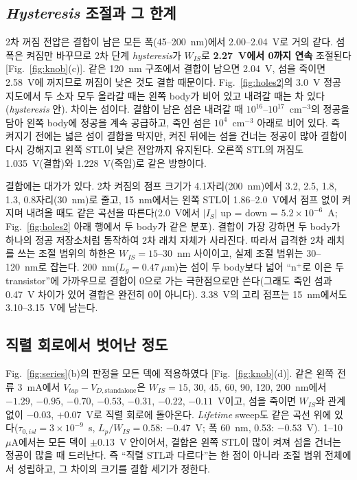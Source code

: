 \documentclass[journal]{IEEEtran}
\begin{document}
\subsection{\textit{Hysteresis} 조절과 그 한계}
2차 꺼짐 전압은 결합이 남은 모든 폭(45--200~nm)에서 2.00--2.04~V로 거의 같다. 섬 폭은 켜짐만 바꾸므로 2차 단계 \textit{hysteresis}가 $W_{IS}$로 \textbf{2.27~V에서 0까지 연속} 조절된다 [Fig.~\ref{fig:knob}(c)]. 같은 120~nm 구조에서 결합이 남으면 2.04~V, 섬을 죽이면 2.58~V에 꺼지므로 꺼짐이 낮은 것도 결합 때문이다. Fig.~\ref{fig:holes2}의 3.0~V 정공 지도에서 두 소자 모두 올라갈 때는 왼쪽 body가 비어 있고 내려갈 때는 차 있다(\textit{hysteresis} 안). 차이는 섬이다. 결합이 남은 섬은 내려갈 때 $10^{16}$--$10^{17}$~cm$^{-3}$의 정공을 담아 왼쪽 body에 정공을 계속 공급하고, 죽인 섬은 $10^{4}$~cm$^{-3}$ 아래로 비어 있다. 즉 켜지기 전에는 넓은 섬이 결합을 막지만, 켜진 뒤에는 섬을 건너는 정공이 많아 결합이 다시 강해지고 왼쪽 STL이 낮은 전압까지 유지된다. 오른쪽 STL의 꺼짐도 1.035~V(결합)와 1.228~V(죽임)로 같은 방향이다.

결합에는 대가가 있다. 2차 켜짐의 점프 크기가 4.1자리(200~nm)에서 3.2, 2.5, 1.8, 1.3, 0.8자리(30~nm)로 줄고, 15~nm에서는 왼쪽 STL이 1.86--2.0~V에서 점프 없이 켜지며 내려올 때도 같은 곡선을 따른다(2.0~V에서 $|I_S|$ up = down = $5.2\times10^{-6}$~A; Fig.~\ref{fig:holes2} 아래 행에서 두 body가 같은 분포). 결합이 가장 강하면 두 body가 하나의 정공 저장소처럼 동작하여 2차 래치 자체가 사라진다. 따라서 급격한 2차 래치를 쓰는 조절 범위의 하한은 $W_{IS}=15$--30~nm 사이이고, 실제 조절 범위는 30--120~nm로 잡는다. 200~nm($L_g=0.47~\mu$m)는 섬이 두 body보다 넓어 ``n$^+$로 이은 두 transistor''에 가까우므로 결합이 0으로 가는 극한점으로만 쓴다(그래도 죽인 섬과 0.47~V 차이가 있어 결합은 완전히 0이 아니다). 3.38~V의 고리 점프는 15~nm에서도 3.10--3.15~V에 남는다.

\subsection{직렬 회로에서 벗어난 정도}
Fig.~\ref{fig:series}(b)의 판정을 모든 덱에 적용하였다 [Fig.~\ref{fig:knob}(d)]. 같은 왼쪽 전류 3~mA에서 $V_{tap}-V_{D,\mathrm{standalone}}$은 $W_{IS}=15$, 30, 45, 60, 90, 120, 200~nm에서 $-1.29$, $-0.95$, $-0.70$, $-0.53$, $-0.31$, $-0.22$, $-0.11$~V이고, 섬을 죽이면 $W_{IS}$와 관계없이 $-0.03$, $+0.07$~V로 직렬 회로에 돌아온다. \textit{Lifetime} sweep도 같은 곡선 위에 있다($\tau_{0,isl}=3\times10^{-9}$~s, $L_p/W_{IS}=0.58$: $-0.47$~V; 폭 60~nm, 0.53: $-0.53$~V). 1--10~$\mu$A에서는 모든 덱이 $\pm0.13$~V 안이어서, 결합은 왼쪽 STL이 많이 켜져 섬을 건너는 정공이 많을 때 드러난다. 즉 ``직렬 STL과 다르다''는 한 점이 아니라 조절 범위 전체에서 성립하고, 그 차이의 크기를 결합 세기가 정한다.
\end{document}
